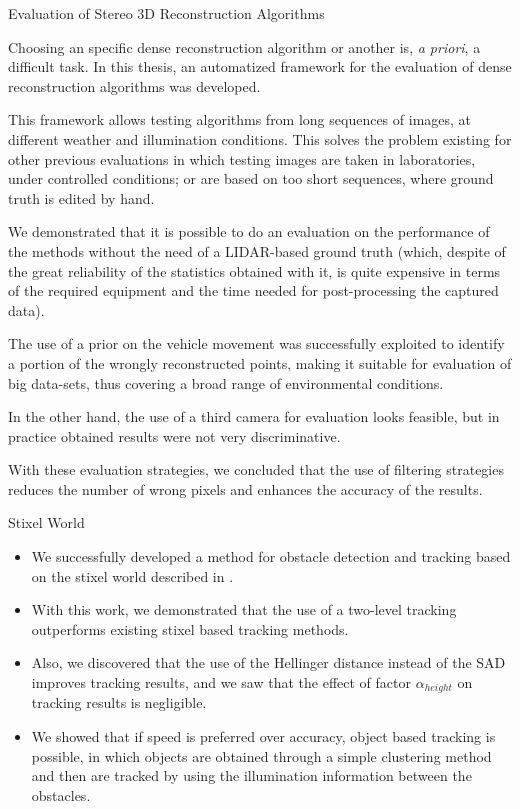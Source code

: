 \begin{frame}{Evaluation of Stereo 3D Reconstruction Algorithms}
  \small
  \begin{itemize}
   {
    \item Choosing an specific dense reconstruction algorithm or another is, \emph{a priori}, a difficult task. In this thesis, an automatized framework for the evaluation of dense reconstruction algorithms was developed.
    \item This framework allows testing algorithms from long sequences of images, at different weather and illumination conditions. This solves the problem existing for other previous evaluations in which testing images are taken in laboratories, under controlled conditions; or are based on too short sequences, where ground truth is edited by hand.
    \item We demonstrated that it is possible to do an evaluation on the performance of the methods without the need of a LIDAR-based ground truth (which, despite of the great reliability of the statistics obtained with it, is quite expensive in terms of the required equipment and the time needed for post-processing the captured data). 
    }
     {
    \item The use of a prior on the vehicle movement was successfully exploited to identify a portion of the wrongly reconstructed points, making it suitable for evaluation of big data-sets, thus covering a broad range of environmental conditions. 
    \item In the other hand, the use of a third camera for evaluation looks feasible, but in practice obtained results were not very discriminative.
    \item With these evaluation strategies, we concluded that the use of filtering strategies reduces the number of wrong pixels and enhances the accuracy of the results. 
    }
  \end{itemize}
\end{frame}

\begin{frame}{Stixel World}
  \small
  \begin{itemize}
    \item We successfully developed a method for obstacle detection and tracking based on the stixel world described in \cite{badino2009stixel}. 
    \item With this work, we demonstrated that the use of a two-level tracking outperforms existing stixel based tracking methods. \item Also, we discovered that the use of the Hellinger distance instead of the SAD improves tracking results, and we saw that the effect of factor $\alpha_{height}$ on tracking results is negligible. 
    \item We showed that if speed is preferred over accuracy, object based tracking is possible, in which objects are obtained through a simple clustering method and then are tracked by using the illumination information between the obstacles.
  \end{itemize}
\end{frame}


